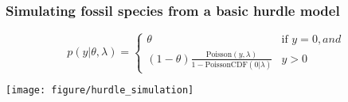 \documentclass{beamer}
\begin{document}
\begin{frame}
  \frametitle{Simulating fossil species from a basic hurdle model}
\begin{equation*}
  p(y | \theta, \lambda)  = 
  \begin{cases}
    \theta & \text{if } y = 0, and \\
    (1 - \theta) \frac{\text{Poisson}(y, \lambda)}{1 - \text{PoissonCDF}(0 | \lambda)} & y > 0
  \end{cases}
\end{equation*}
  \begin{center}
    \texttt{[image: figure/hurdle\_simulation]}
  \end{center}
\end{frame}
\end{document}
